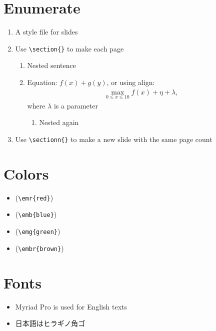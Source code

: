 \documentclass[xelatex,ja=standard,jafont=hiragino-pron,fleqn,no-math,25pt,paper={190.5truemm}{254truemm},english]{bxjsslidemd}
\begin{document}
\section{Enumerate}
\begin{enumerate}
 \item A style file for slides
 \item Use \verb|\section{}| to make each page
       \begin{enumerate}
	\item Nested sentence
	\item Equation: $f(x) + g(y)$, or using align:
	      \begin{align*}
	       \max_{0 \le x \le 10} f(x) + \eta + \lambda,
	      \end{align*}
	      where $\lambda$ is a parameter
	      \begin{enumerate}
	       \item Nested again
	      \end{enumerate}
       \end{enumerate}
 \item Use \verb|\sectionn{}| to make a new slide with the same page count
\end{enumerate}

\section{Colors}
\begin{itemize}
 \item {} (\verb|\emr{red}|)
 \item {} (\verb|\emb{blue}|)
 \item {} (\verb|\emg{green}|)
 \item {} (\verb|\embr{brown}|)
\end{itemize}

\section{Fonts}
\begin{itemize}
 \item Myriad Pro is used for English texts
 \item 日本語はヒラギノ角ゴ
\end{itemize}
\end{document}

